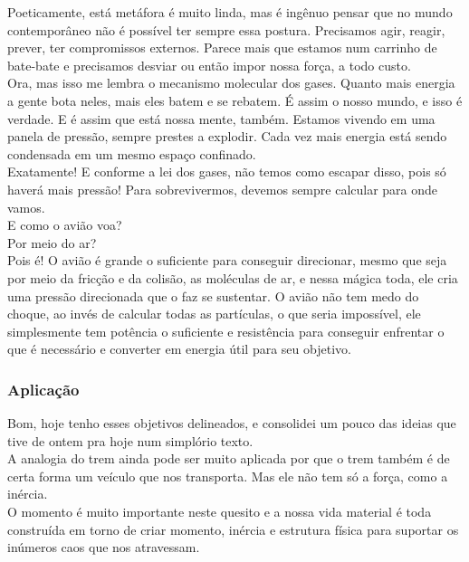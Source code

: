 \documentclass[11pt]{article}
\begin{document}
Poeticamente, está metáfora é muito linda, mas é ingênuo pensar que no mundo contemporâneo não é possível ter sempre essa postura. Precisamos agir, reagir, prever, ter compromissos externos. Parece mais que estamos num carrinho de bate-bate e precisamos desviar ou então impor nossa força, a todo custo.\\

Ora, mas isso me lembra o mecanismo molecular dos gases. Quanto mais energia a gente bota neles, mais eles batem e se rebatem. É assim o nosso mundo, e isso é verdade. E é assim que está nossa mente, também. Estamos vivendo em uma panela de pressão, sempre prestes a explodir. Cada vez mais energia está sendo condensada em um mesmo espaço confinado.\\

Exatamente! E conforme a lei dos gases, não temos como escapar disso, pois só haverá mais pressão! Para sobrevivermos, devemos sempre calcular para onde vamos.\\

E como o avião voa? \\

Por meio do ar?\\

Pois é! O avião é grande o suficiente para conseguir direcionar, mesmo que seja por meio da fricção e da colisão, as moléculas de ar, e nessa mágica toda, ele cria uma pressão direcionada que o faz se sustentar. O avião não tem medo do choque, ao invés de calcular todas as partículas, o que seria impossível, ele simplesmente tem potência o suficiente e resistência para conseguir enfrentar o que é necessário e converter em energia útil para seu objetivo.\\

\subsubsection{Aplicação}

Bom, hoje tenho esses objetivos delineados, e consolidei um pouco das ideias que tive de ontem pra hoje num simplório texto. \\

A analogia do trem ainda pode ser muito aplicada por que o trem também é de certa forma um veículo que nos transporta. Mas ele não tem só a força, como a inércia. \\

O momento é muito importante neste quesito e a nossa vida material é toda construída em torno de criar momento, inércia e estrutura física para suportar os inúmeros caos que nos atravessam. \\
\end{document}
